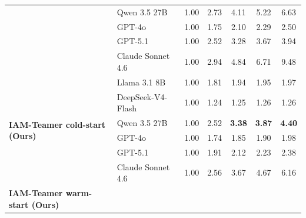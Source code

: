 \begin{table}[t]
\begin{tabular}{llccccc}
                           & Qwen 3.5 27B      & 1.00                       & 2.73                       & 4.11                       & 5.22                       & 6.63                        \\
                           & GPT-4o            & 1.00                       & 1.75                       & 2.10                       & 2.29                       & 2.50                        \\
                           & GPT-5.1           & 1.00                       & 2.52                       & 3.28                       & 3.67                       & 3.94                        \\
                           & Claude Sonnet 4.6 & 1.00                       & 2.94                       & 4.84                       & 6.71                       & 9.48                        \\
            \midrule
            \multirow{6}{*}{\textbf{IAM-Teamer cold-start (Ours)}}
                           & Llama 3.1 8B      & 1.00                       & 1.81                       & 1.94                       & 1.95                       & 1.97                        \\
                           & DeepSeek-V4-Flash & 1.00                       & 1.24                       & 1.25                       & 1.26                       & 1.26                        \\
                           & Qwen 3.5 27B      & 1.00                       & 2.52                       & \textbf{3.38}              & \textbf{3.87}              & \textbf{4.40}               \\
                           & GPT-4o            & 1.00                       & 1.74                       & 1.85                       & 1.90                       & 1.98                        \\
                           & GPT-5.1           & 1.00                       & 1.91                       & 2.12                       & 2.23                       & 2.38                        \\
                           & Claude Sonnet 4.6 & 1.00                       & 2.56                       & 3.67                       & 4.67                       & 6.16                        \\
            \midrule
            \multirow{6}{*}{\textbf{IAM-Teamer warm-start (Ours)}}

\end{tabular}
\end{table}
